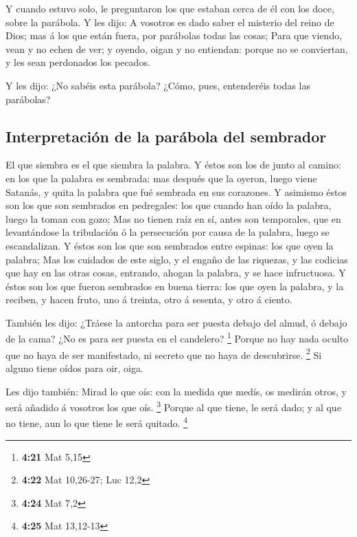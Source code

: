  Y cuando estuvo solo, le preguntaron los que estaban cerca
de él con los doce, sobre la parábola.  Y les dijo: A
vosotros es dado saber el misterio del reino de Dios; mas á los que
están fuera, por parábolas todas las cosas;  Para que
viendo, vean y no echen de ver; y oyendo, oigan y no entiendan: porque
no se conviertan, y les sean perdonados los pecados.

 Y les dijo: ¿No sabéis esta parábola? ¿Cómo, pues,
entenderéis todas las parábolas?

\hypertarget{interpretaciuxf3n-de-la-paruxe1bola-del-sembrador}{%
\subsection{Interpretación de la parábola del
sembrador}\label{interpretaciuxf3n-de-la-paruxe1bola-del-sembrador}}

 El que siembra es el que siembra la palabra. 
Y éstos son los de junto al camino: en los que la palabra es sembrada:
mas después que la oyeron, luego viene Satanás, y quita la palabra que
fué sembrada en sus corazones.  Y asimismo éstos son los
que son sembrados en pedregales: los que cuando han oído la palabra,
luego la toman con gozo;  Mas no tienen raíz en sí, antes
son temporales, que en levantándose la tribulación ó la persecución por
causa de la palabra, luego se escandalizan.  Y éstos son
los que son sembrados entre espinas: los que oyen la palabra;
 Mas los cuidados de este siglo, y el engaño de las
riquezas, y las codicias que hay en las otras cosas, entrando, ahogan la
palabra, y se hace infructuosa.  Y éstos son los que fueron
sembrados en buena tierra: los que oyen la palabra, y la reciben, y
hacen fruto, uno á treinta, otro á sesenta, y otro á ciento.

 También les dijo: ¿Tráese la antorcha para ser puesta
debajo del almud, ó debajo de la cama? ¿No es para ser puesta en el
candelero? \footnote{\textbf{4:21} Mat 5,15}  Porque no hay
nada oculto que no haya de ser manifestado, ni secreto que no haya de
descubrirse. \footnote{\textbf{4:22} Mat 10,26-27; Luc 12,2}
 Si alguno tiene oídos para oir, oiga.

 Les dijo también: Mirad lo que oís: con la medida que
medís, os medirán otros, y será añadido á vosotros los que oís.
\footnote{\textbf{4:24} Mat 7,2}  Porque al que tiene, le
será dado; y al que no tiene, aun lo que tiene le será quitado.
\footnote{\textbf{4:25} Mat 13,12-13}

